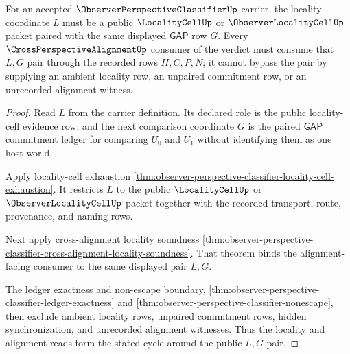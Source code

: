 \begin{theorem}
\label{thm:observer-perspective-classifier-alignment-locality-cycle}
For an accepted $\ObserverPerspectiveClassifierUp$ carrier, the locality coordinate $L$ must be a public $\LocalityCellUp$ or $\ObserverLocalityCellUp$ packet paired with the same displayed $\mathsf{GAP}$ row $G$. Every $\CrossPerspectiveAlignmentUp$ consumer of the verdict must consume that $L,G$ pair through the recorded rows $H,C,P,N$; it cannot bypass the pair by supplying an ambient locality row, an unpaired commitment row, or an unrecorded alignment witness.
\end{theorem}
\begin{proof}
Read $L$ from the carrier definition. Its declared role is the public locality-cell evidence row, and the next comparison coordinate $G$ is the paired $\mathsf{GAP}$ commitment ledger for comparing $U_0$ and $U_1$ without identifying them as one host world.

Apply locality-cell exhaustion \autoref{thm:observer-perspective-classifier-locality-cell-exhaustion}. It restricts $L$ to the public $\LocalityCellUp$ or $\ObserverLocalityCellUp$ packet together with the recorded transport, route, provenance, and naming rows.

Next apply cross-alignment locality soundness \autoref{thm:observer-perspective-classifier-cross-alignment-locality-soundness}. That theorem binds the alignment-facing consumer to the same displayed pair $L,G$.

The ledger exactness and non-escape boundary, \autoref{thm:observer-perspective-classifier-ledger-exactness} and \autoref{thm:observer-perspective-classifier-nonescape}, then exclude ambient locality rows, unpaired commitment rows, hidden synchronization, and unrecorded alignment witnesses. Thus the locality and alignment reads form the stated cycle around the public $L,G$ pair.
\end{proof}

